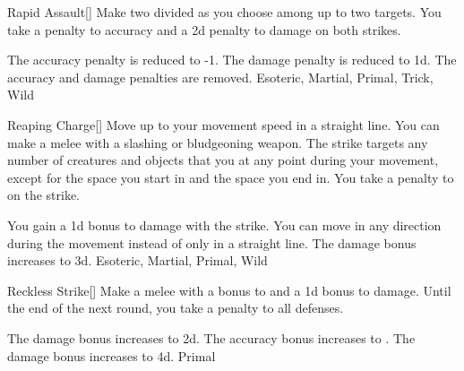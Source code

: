 \lowercase{\hypertarget{maneuver:Rapid Assault}{}}\label{maneuver:Rapid Assault}
\hypertarget{maneuver:Rapid Assault}{}
\begin{freeability}{Rapid Assault}[]
Make two  divided as you choose among up to two targets.
You take a  penalty to accuracy and a \minus2d penalty to damage on both strikes.

\rankline
{} The accuracy penalty is reduced to -1.
 The damage penalty is reduced to \minus1d.
 The accuracy and damage penalties are removed.
 Esoteric, Martial, Primal, Trick, Wild
\end{freeability}
\vspace{0.25em}



\lowercase{\hypertarget{maneuver:Reaping Charge}{}}\label{maneuver:Reaping Charge}
\hypertarget{maneuver:Reaping Charge}{}
\begin{freeability}{Reaping Charge}[]
Move up to your movement speed in a straight line.
You can make a melee  with a slashing or bludgeoning weapon.
The strike targets any number of creatures and objects that you  at any point during your movement, except for the space you start in and the space you end in.
You take a  penalty to  on the strike.

\rankline
{} You gain a \plus1d bonus to damage with the strike.
 You can move in any direction during the movement instead of only in a straight line.
 The damage bonus increases to \plus3d.
 Esoteric, Martial, Primal, Wild
\end{freeability}
\vspace{0.25em}



\lowercase{\hypertarget{maneuver:Reckless Strike}{}}\label{maneuver:Reckless Strike}
\hypertarget{maneuver:Reckless Strike}{}
\begin{freeability}{Reckless Strike}[]
Make a melee  with a  bonus to  and a \plus1d bonus to damage.
Until the end of the next round, you take a  penalty to all defenses.

\rankline
{} The damage bonus increases to \plus2d.
 The accuracy bonus increases to .
 The damage bonus increases to \plus4d.
 Primal
\end{freeability}
\vspace{0.25em}



